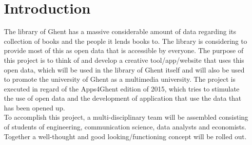 \chapter{Introduction}

The library of Ghent has a massive considerable amount of data regarding its collection of books and the people it lends books to. The library is considering to provide most of this as open data that is accessible by everyone. The purpose of this project is to think of and develop a creative tool/app/website that uses this open data, which will be used in the library of Ghent itself and will also be used to promote the university of Ghent as a multimedia university. The project is executed in regard of the Apps4Ghent edition of 2015, which tries to stimulate the use of open data and the development of application that use the data that has been opened up.\\
To accomplish this project, a multi-disciplinary team will be assembled consisting of students of engineering, communication science, data analysts and economists. Together a well-thought and good looking/functioning concept will be rolled out.